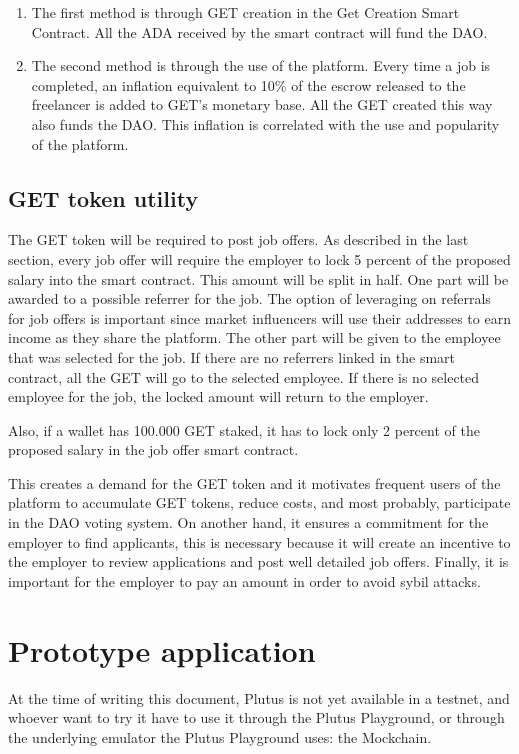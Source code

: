 \documentclass{article}
\begin{document}
\begin{enumerate}
  \item The first method is through GET creation in the Get Creation Smart Contract. All the ADA received by the smart contract will fund the DAO.
  \item The second method is through the use of the platform. Every time a job is completed, an inflation equivalent to 10\% of the escrow released to the freelancer is added to GET's monetary base. All the GET created this way also funds the DAO. This inflation is correlated with the use and popularity of the platform. 
\end{enumerate}

\subsection{GET token utility}

The GET token will be required to post job offers. As described in the last section, every job offer will require the employer to lock 5 percent of the proposed salary into the smart contract. This amount will be split in half. One part will be awarded to a possible referrer for the job. The option of leveraging on referrals for job offers is important since market influencers will use their addresses to earn income as they share the platform. The other part will be given to the employee that was selected for the job. If there are no referrers linked in the smart contract, all the GET will go to the selected employee. If there is no selected employee for the job, the locked amount will return to the employer.

Also, if a wallet has 100.000 GET staked, it has to lock only 2 percent of the proposed salary in the job offer smart contract.

This creates a demand for the GET token and it motivates frequent users of the platform to accumulate GET tokens, reduce costs, and most probably, participate in the DAO voting system. On another hand, it ensures a commitment for the employer to find applicants, this is necessary because it will create an incentive to the employer to review applications and post well detailed job offers. Finally, it is important for the employer to pay an amount in order to avoid sybil attacks.

\section{Prototype application}
At the time of writing this document, Plutus is not yet available in a testnet, and whoever want to try it have to use it through the Plutus Playground, or through the underlying emulator the Plutus Playground uses: the Mockchain.
\end{document}
